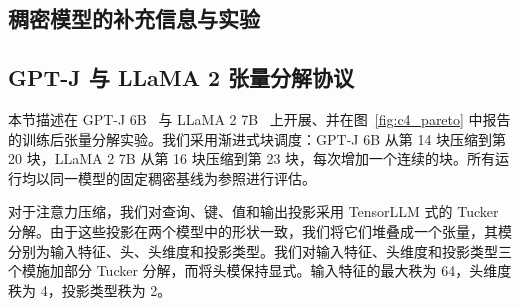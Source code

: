 \documentclass[11pt]{article}
\begin{document}
\begin{appendixpart}




\section{稠密模型的补充信息与实验}
\subsection{GPT-J 与 LLaMA 2 张量分解协议}
\label{app:gptj_llama_tensor_protocol}

本节描述在 GPT-J 6B~\citep{gpt-j} 与 LLaMA 2 7B~\citep{touvron2023llama} 上开展、并在图~\ref{fig:c4_pareto} 中报告的训练后张量分解实验。我们采用渐进式块调度：GPT-J 6B 从第 14 块压缩到第 20 块，LLaMA 2 7B 从第 16 块压缩到第 23 块，每次增加一个连续的块。所有运行均以同一模型的固定稠密基线为参照进行评估。

对于注意力压缩，我们对查询、键、值和输出投影采用 TensorLLM 式的 Tucker 分解。由于这些投影在两个模型中的形状一致，我们将它们堆叠成一个张量，其模分别为输入特征、头、头维度和投影类型。我们对输入特征、头维度和投影类型三个模施加部分 Tucker 分解，而将头模保持显式。输入特征的最大秩为 64，头维度秩为 4，投影类型秩为 2。


\end{appendixpart}
\end{document}
